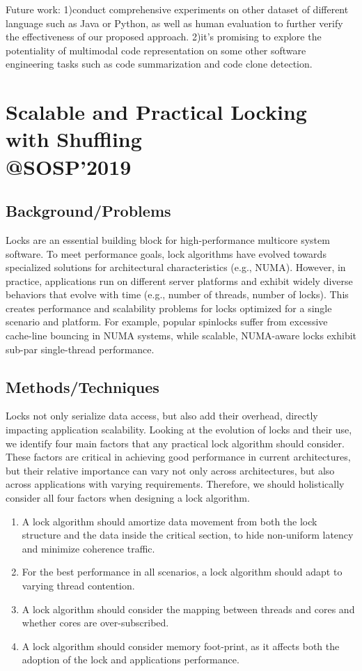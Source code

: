 Future work: 1)conduct comprehensive experiments on other dataset of different language such as Java or Python, as well as human evaluation to further verify the effectiveness of our proposed approach.  2)it’s promising to explore the potentiality of multimodal code representation on some other software engineering tasks such as code summarization and code clone detection.
\newpage
\section{Scalable and Practical Locking with Shuffling \\@SOSP'2019 }
\subsection{Background/Problems}
Locks are an essential building block for high-performance multicore system software. To meet performance goals, lock algorithms have evolved towards specialized solutions for architectural characteristics (e.g., NUMA). However, in practice, applications run on different server platforms and exhibit widely diverse behaviors that evolve with time (e.g., number of threads, number of locks). This creates performance and scalability problems for locks optimized for a single scenario and platform. For example, popular spinlocks suffer from excessive cache-line bouncing in NUMA systems, while scalable, NUMA-aware locks exhibit sub-par single-thread performance.

\subsection{Methods/Techniques}
Locks not only serialize data access, but also add their overhead, directly impacting application scalability. Looking at the evolution of locks and their use, we identify four main factors that any practical lock algorithm should consider.  These factors are critical in achieving good performance in current architectures, but their relative importance can vary not only across architectures, but also across applications with varying requirements. Therefore, we should holistically consider all four factors when designing a lock algorithm.

\begin{enumerate}
\item A lock algorithm should amortize data movement from both the lock structure and the data inside the critical section, to hide non-uniform latency and minimize coherence traffic.
\item For the best performance in all scenarios, a lock algorithm should adapt to varying thread contention.
\item A lock algorithm should consider the mapping between threads and cores and whether cores are over-subscribed.
\item A lock algorithm should consider memory foot-print, as it affects both the adoption of the lock and applications performance.
\end{enumerate}

